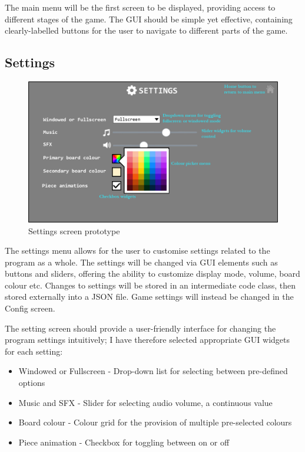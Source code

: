 \documentclass[../main/main.tex]{subfiles}
\begin{document}
The main menu will be the first screen to be displayed, providing access to different stages of the game. The GUI should be simple yet effective, containing clearly-labelled buttons for the user to navigate to different parts of the game.

\subsection{Settings}
\begin{figure}[H]
    \centering
    \includegraphics[width=0.8\columnwidth]{../design/assets/settings_gui.png}
    \caption{Settings screen prototype}
    \label{fig:settings-gui}
\end{figure}

The settings menu allows for the user to customise settings related to the program as a whole. The settings will be changed via GUI elements such as buttons and sliders, offering the ability to customize display mode, volume, board colour etc. Changes to settings will be stored in an intermediate code class, then stored externally into a JSON file. Game settings will instead be changed in the Config screen.

The setting screen should provide a user-friendly interface for changing the program settings intuitively; I have therefore selected appropriate GUI widgets for each setting:

\begin{itemize}
\item Windowed or Fullscreen - Drop-down list for selecting between pre-defined options
\item Music and SFX - Slider for selecting audio volume, a continuous value
\item Board colour - Colour grid for the provision of multiple pre-selected colours
\item Piece animation - Checkbox for toggling between on or off
\end{itemize}
\end{document}

